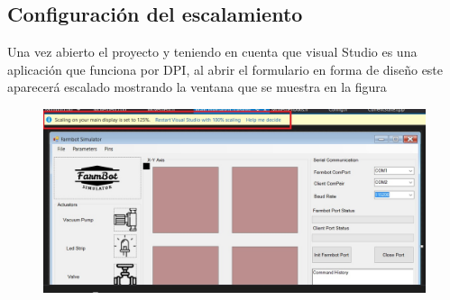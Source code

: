 \documentclass[letterpaper,12pt]{article}
\begin{document}
\subsection{Configuración del escalamiento}
Una vez abierto el proyecto y teniendo en cuenta que visual Studio es una aplicación que funciona por DPI, al abrir el formulario en forma de diseño este aparecerá escalado mostrando la ventana que se muestra en la figura  
\begin{figure}[H]
	\centering
	\includegraphics[width=0.7\linewidth]{images/scaling}
	\label{fig:scaling}
\end{figure}
\end{document}

